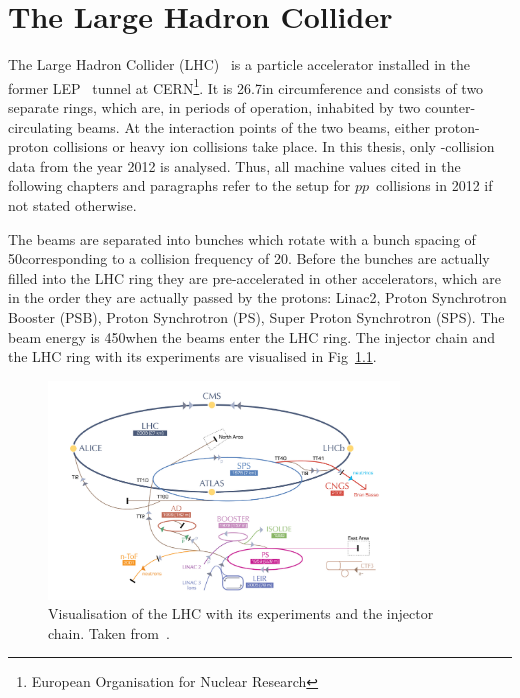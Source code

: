 \chapter{The Large Hadron Collider}

The Large Hadron Collider (LHC)~\cite{bib:LHC_machine_2008,bib:LHC_2004} is a particle accelerator installed in the former LEP~\cite{bib:LEP_design_1984} tunnel at CERN\footnote{European Organisation for Nuclear Research}.
It is 26.7\km in circumference and consists of two separate rings, which are, in periods of operation, inhabited by two counter-circulating beams.
At the interaction points of the two beams, either proton-proton collisions or heavy ion collisions take place.
In this thesis, only \pp-collision data from the year 2012 is analysed.
Thus, all machine values cited in the following chapters and paragraphs refer to the setup for $pp$~collisions in 2012 if not stated otherwise.

The beams are separated into bunches which rotate with a bunch spacing of 50\ns corresponding to a collision frequency of 20\mhz.
Before the bunches are actually filled into the LHC ring they are pre-accelerated in other accelerators, which are in the order they are actually passed by the protons: Linac2, Proton  Synchrotron Booster (PSB), Proton Synchrotron (PS), Super Proton Synchrotron (SPS).
The beam energy is 450\gev when the beams enter the LHC ring.
The injector chain and the LHC ring with its experiments are visualised in Fig~\ref{fig:LHC}.
\begin{figure}[!b]
  \centering
      \includegraphics[width=0.83\textwidth]{figures/experiment/LHC/LHC_small.png}
  \caption{Visualisation of the LHC with its experiments and the injector chain. Taken from~\cite{bib:CERNBrochure}.}  
  \label{fig:LHC}
\end{figure}

